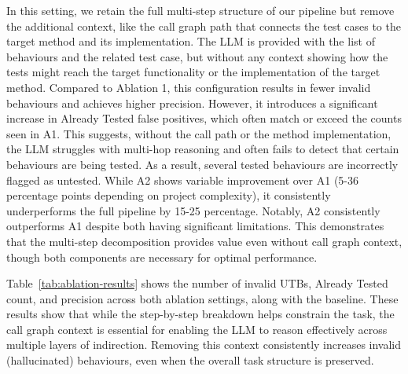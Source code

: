 In this setting, we retain the full multi-step structure of our pipeline but remove the additional context, like the call graph path that connects the test cases to the target method and its implementation. 
The LLM is provided with the list of behaviours and the related test case, but without any context showing how the tests might reach the target functionality or the implementation of the target method.
%
Compared to Ablation 1, this configuration results in fewer invalid behaviours and achieves higher precision. However, it introduces a significant increase in Already Tested false positives, which often match or exceed the counts seen in A1.
This suggests, without the call path or the method implementation, the LLM struggles with multi-hop reasoning and often fails to detect that certain behaviours are being tested. As a result, several tested behaviours are incorrectly flagged as untested. While A2 shows variable improvement over A1 (5-36 percentage points depending on project complexity), it consistently underperforms the full pipeline by 15-25 percentage. Notably, A2 consistently outperforms A1 despite both having significant limitations. This demonstrates that the multi-step decomposition provides value even without call graph context, though both components are necessary for optimal performance.

Table~\ref{tab:ablation-results} shows the number of invalid UTBs, Already Tested count, and precision across both ablation settings, along with the baseline. These results show that while the step-by-step breakdown helps constrain the task, the call graph context is essential for enabling the LLM to reason effectively across multiple layers of indirection. Removing this context consistently increases invalid (hallucinated) behaviours, even when the overall task structure is preserved.


